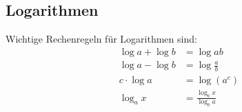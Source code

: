 \documentclass[11pt, a4paper]{article}
\newcommand\braces[1]{\left(#1\right)}
\newif\ifshowsolution
\begin{document}
\begin{enumerate}
	\ifshowsolution
		\begin{align*}
			\intertext{Zunächst formen wir die Reihenglieder um (unter Verwendung vieler Potenzgesetze)}
			a_k &= \frac{(-1)^k \cdot 2^{k-1} - 5 \cdot 6^k}{4^{2k+1}} \\
			&= \frac{(-1)^k \cdot \frac{2^k}{2} - 5 \cdot 6^k}{4 \cdot 4^{2k}} \\
			&= \frac{\frac{-2^k}{2} - 5 \cdot 6^k}{4 \cdot 16^k} \\
			&= \frac{\frac{-2^k}{2}}{4 \cdot 16^k} - \frac{5 \cdot 6^k}{4 \cdot 16^k} \\
			&= \frac{1}{8} \cdot \frac{-2^k}{16^k} - \frac{5}{4} \cdot \frac{6^k}{16^k} \\
			&= \frac{1}{8} \cdot \braces{-\frac{2}{16}}^k - \frac{5}{4} \cdot \braces{\frac{6}{16}}^k \\
			&= \frac{1}{8} \cdot \braces{-\frac{1}{8}}^k - \frac{5}{4} \cdot \braces{\frac{3}{8}}^k
			\intertext{Wenden wir uns nun wieder der gesammten Reihe zu}
			\sum_{k=0}^\infty a_k &= \sum_{k=0}^\infty \braces{\frac{1}{8} \cdot \braces{-\frac{1}{8}}^k - \frac{5}{4} \cdot \braces{\frac{3}{8}}^k} \\
			&= \sum_{k=0}^\infty \frac{1}{8} \cdot \braces{-\frac{1}{8}}^k - \sum_{k=0}^\infty \frac{5}{8} \cdot \braces{\frac{3}{8}}^k \\
			&= \frac{1}{8} \underbrace{\sum_{k=0}^\infty \braces{-\frac{1}{8}}^k}_{\text{geom. Reihe}} - \frac{5}{8} \underbrace{\sum_{k=0}^\infty \braces{\frac{3}{8}}^k}_{\text{geom. Reihe}} \\
			&= \frac{1}{8} \cdot \frac{1}{1-\braces{-\frac{1}{8}}} - \frac{5}{4} \cdot \frac{1}{1-\frac{3}{8}} \\
			\intertext{Dies lässt sich vereinfachen zum Grenzwert der Reihe}
			&= -\frac{17}{9}
		\end{align*}
	\fi
\end{enumerate}

\subsection{Logarithmen}
Wichtige Rechenregeln für Logarithmen sind:
\begin{align*}
	\log a + \log b &= \log ab \\
	\log a - \log b &= \log \frac{a}{b} \\
	c \cdot \log a &= \log \braces{a^c} \\
	\log_a x &= \frac{\log_b x}{\log_b a}
\end{align*}
\end{document}
